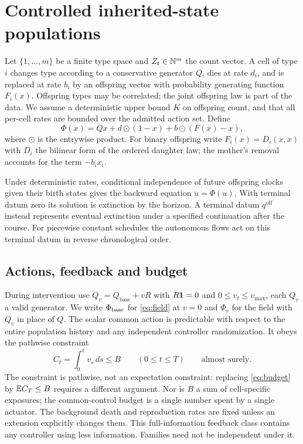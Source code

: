 \section{Controlled inherited-state populations}
\label{sec:model}

Let $\{1,\ldots,m\}$ be a finite type space and $Z_t\in\mathbb N^m$ the count vector.
A cell of type $i$ changes type according to a conservative generator $Q$,
dies at rate $d_i$, and is replaced at rate $b_i$ by an offspring vector with
probability generating function $F_i(x)$. Offspring types may be correlated; the
joint offspring law is part of the data. We assume a deterministic upper bound
$K$ on offspring count, and that all per-cell rates are bounded over the
admitted action set. Define
\begin{equation}\label{eq:field}
 \Phi(x)=Qx+d\odot(1-x)+b\odot(F(x)-x),
\end{equation}
where $\odot$ is the entrywise product. For binary offspring write
$F_i(x)=D_i(x,x)$ with $D_i$ the bilinear form of the ordered daughter law; the
mother's removal accounts for the term $-b_ix_i$.

Under deterministic rates, conditional independence of future offspring clocks
given their birth states gives the backward equation $\dot u=\Phi(u)$. With
terminal datum zero its solution is extinction by the horizon. A terminal datum
$q^{\mathrm{off}}$ instead represents eventual extinction under a specified
continuation after the course. For piecewise constant schedules the autonomous
flows act on this terminal datum in reverse chronological order.

\subsection{Actions, feedback and budget}

During intervention use $Q_v=Q_{\mathrm{base}}+vR$ with $R\mathbf1=0$ and
$0\le v_t\le v_{\max}$, each $Q_v$ a valid generator. We write $\Phi_{\mathrm{base}}$ for
\eqref{eq:field} at $v=0$ and $\Phi_v$ for the field with $Q_v$ in place of $Q$.
The scalar common action is predictable with respect to the entire population
history and any independent controller randomization. It obeys the pathwise
constraint
\begin{equation}\label{eq:budget}
 C_t=\int_0^tv_s\,ds\le B \qquad(0\le t\le T)
 \qquad\text{almost surely.}
\end{equation}
The constraint is pathwise, not an expectation constraint: replacing
\eqref{eq:budget} by $\mathbb E C_T\le B$ requires a different argument. Nor is $B$ a
sum of cell-specific exposures; the common-control budget is a single number
spent by a single actuator. The background death and reproduction rates are
fixed unless an extension explicitly changes them. This full-information
feedback class contains any controller using less information. Families need not
be independent under it.

